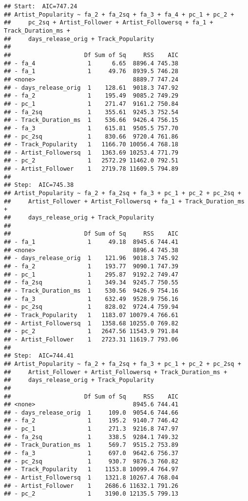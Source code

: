 \documentclass[
]{article}
\begin{document}
\begin{verbatim}
## Start:  AIC=747.24
## Artist_Popularity ~ fa_2 + fa_2sq + fa_3 + fa_4 + pc_1 + pc_2 + 
##     pc_2sq + Artist_Follower + Artist_Followersq + fa_1 + Track_Duration_ms + 
##     days_release_orig + Track_Popularity
## 
##                     Df Sum of Sq     RSS    AIC
## - fa_4               1      6.65  8896.4 745.38
## - fa_1               1     49.76  8939.5 746.28
## <none>                            8889.7 747.24
## - days_release_orig  1    128.61  9018.3 747.92
## - fa_2               1    195.49  9085.2 749.29
## - pc_1               1    271.47  9161.2 750.84
## - fa_2sq             1    355.61  9245.3 752.54
## - Track_Duration_ms  1    536.66  9426.4 756.15
## - fa_3               1    615.81  9505.5 757.70
## - pc_2sq             1    830.66  9720.4 761.86
## - Track_Popularity   1   1166.70 10056.4 768.18
## - Artist_Followersq  1   1363.69 10253.4 771.79
## - pc_2               1   2572.29 11462.0 792.51
## - Artist_Follower    1   2719.78 11609.5 794.89
## 
## Step:  AIC=745.38
## Artist_Popularity ~ fa_2 + fa_2sq + fa_3 + pc_1 + pc_2 + pc_2sq + 
##     Artist_Follower + Artist_Followersq + fa_1 + Track_Duration_ms + 
##     days_release_orig + Track_Popularity
## 
##                     Df Sum of Sq     RSS    AIC
## - fa_1               1     49.18  8945.6 744.41
## <none>                            8896.4 745.38
## - days_release_orig  1    121.96  9018.3 745.92
## - fa_2               1    193.77  9090.1 747.39
## - pc_1               1    295.87  9192.2 749.47
## - fa_2sq             1    349.34  9245.7 750.55
## - Track_Duration_ms  1    530.56  9426.9 754.16
## - fa_3               1    632.49  9528.9 756.16
## - pc_2sq             1    828.02  9724.4 759.94
## - Track_Popularity   1   1183.07 10079.4 766.61
## - Artist_Followersq  1   1358.68 10255.0 769.82
## - pc_2               1   2647.56 11543.9 791.84
## - Artist_Follower    1   2723.31 11619.7 793.06
## 
## Step:  AIC=744.41
## Artist_Popularity ~ fa_2 + fa_2sq + fa_3 + pc_1 + pc_2 + pc_2sq + 
##     Artist_Follower + Artist_Followersq + Track_Duration_ms + 
##     days_release_orig + Track_Popularity
## 
##                     Df Sum of Sq     RSS    AIC
## <none>                            8945.6 744.41
## - days_release_orig  1     109.0  9054.6 744.66
## - fa_2               1     195.2  9140.7 746.42
## - pc_1               1     271.3  9216.8 747.97
## - fa_2sq             1     338.5  9284.1 749.32
## - Track_Duration_ms  1     569.7  9515.2 753.89
## - fa_3               1     697.0  9642.6 756.37
## - pc_2sq             1     930.7  9876.3 760.82
## - Track_Popularity   1    1153.8 10099.4 764.97
## - Artist_Followersq  1    1321.8 10267.4 768.04
## - Artist_Follower    1    2686.6 11632.1 791.26
## - pc_2               1    3190.0 12135.5 799.13
\end{verbatim}
\end{document}
